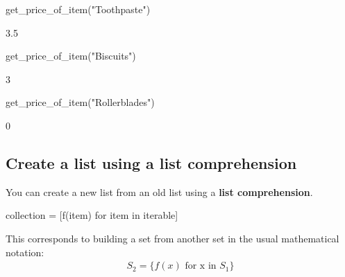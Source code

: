\begin{pyin}
get_price_of_item("Toothpaste")
\end{pyin}





\begin{raw}
3.5
\end{raw}







\begin{pyin}
get_price_of_item("Biscuits")
\end{pyin}





\begin{raw}
3
\end{raw}







\begin{pyin}
get_price_of_item("Rollerblades")
\end{pyin}





\begin{raw}
0
\end{raw}





\subsection{Create a list using a list comprehension}
\label{\detokenize{tools-for-mathematics/06-probability/how/main:create-a-list-using-a-list-comprehension}}\label{\detokenize{tools-for-mathematics/06-probability/how/main:id3}}

You can create a new list from an old list using a \textbf{list comprehension}.


\begin{pyin}
collection = [f(item) for item in iterable]
\end{pyin}



This corresponds to building a set from another set in the usual mathematical
notation:
\begin{equation*}
\begin{split}
S_2 = \{f(x)\text{ for x in }S_1\}
\end{split}
\end{equation*}

